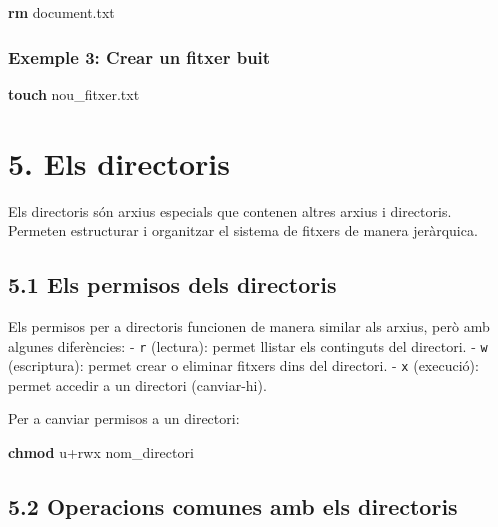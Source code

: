 \documentclass[
  12 pt,
  a4paper,
]{article}
\newenvironment{Shaded}{\begin{snugshade}}{\end{snugshade}}
\newcommand{\FunctionTok}[1]{\textcolor[rgb]{0.13,0.29,0.53}{\textbf{#1}}}
\newcommand{\NormalTok}[1]{#1}
\begin{document}
\begin{Shaded}
\begin{Highlighting}[]
\FunctionTok{rm}\NormalTok{ document.txt}
\end{Highlighting}
\end{Shaded}

\subsubsection{Exemple 3: Crear un fitxer
buit}\label{exemple-3-crear-un-fitxer-buit}

\begin{Shaded}
\begin{Highlighting}[]
\FunctionTok{touch}\NormalTok{ nou\_fitxer.txt}
\end{Highlighting}
\end{Shaded}

\section{5. Els directoris}\label{els-directoris}

Els directoris són arxius especials que contenen altres arxius i
directoris. Permeten estructurar i organitzar el sistema de fitxers de
manera jeràrquica.

\subsection{5.1 Els permisos dels
directoris}\label{els-permisos-dels-directoris}

Els permisos per a directoris funcionen de manera similar als arxius,
però amb algunes diferències: - \texttt{r} (lectura): permet llistar els
continguts del directori. - \texttt{w} (escriptura): permet crear o
eliminar fitxers dins del directori. - \texttt{x} (execució): permet
accedir a un directori (canviar-hi).

Per a canviar permisos a un directori:

\begin{Shaded}
\begin{Highlighting}[]
\FunctionTok{chmod}\NormalTok{ u+rwx nom\_directori}
\end{Highlighting}
\end{Shaded}

\subsection{5.2 Operacions comunes amb els
directoris}\label{operacions-comunes-amb-els-directoris}
\end{document}
